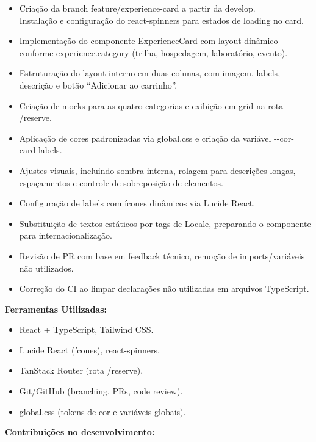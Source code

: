 \begin{itemize}
\item
  Criação da branch feature/experience-card a partir da develop.\\
  Instalação e configuração do react-spinners para estados de loading no
  card.
\item
  Implementação do componente ExperienceCard com layout dinâmico
  conforme experience.category (trilha, hospedagem, laboratório,
  evento).
\item
  Estruturação do layout interno em duas colunas, com imagem, labels,
  descrição e botão ``Adicionar ao carrinho''.
\item
  Criação de mocks para as quatro categorias e exibição em grid na rota
  /reserve.
\item
  Aplicação de cores padronizadas via global.css e criação da variável
  -\/-cor-card-labels.
\item
  Ajustes visuais, incluindo sombra interna, rolagem para descrições longas,
  espaçamentos e controle de sobreposição de elementos.
\item
  Configuração de labels com ícones dinâmicos via Lucide React.
\item
  Substituição de textos estáticos por tags de Locale, preparando o
  componente para internacionalização.
\item
  Revisão de PR com base em feedback técnico, remoção de
  imports/variáveis não utilizados.
\item
  Correção do CI ao limpar declarações não utilizadas em arquivos
  TypeScript.
\end{itemize}

\textbf{Ferramentas Utilizadas:}

\begin{itemize}
\item
  React + TypeScript, Tailwind CSS.
\item
  Lucide React (ícones), react-spinners.
\item
  TanStack Router (rota /reserve).
\item
  Git/GitHub (branching, PRs, code review).
\item
  global.css (tokens de cor e variáveis globais).
\end{itemize}

\textbf{Contribuições no desenvolvimento:}

